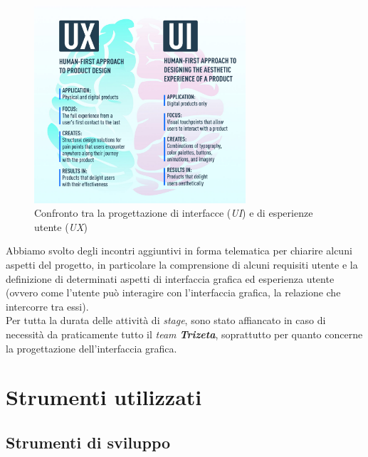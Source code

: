 \begin{figure}[H]
    \centering
    \includegraphics[width=0.7\textwidth]{images/difference-between-ux-and-ui.jpg}
    \caption[Confronto tra la progettazione di interfacce e di esperienze utente]{Confronto tra la progettazione di interfacce (\textit{UI}) e di esperienze utente (\textit{UX})\footnotemark}
\end{figure}
Abbiamo svolto degli incontri aggiuntivi in forma telematica per chiarire alcuni aspetti del progetto, in particolare la comprensione di alcuni requisiti utente e la definizione di determinati aspetti 
di interfaccia grafica ed esperienza utente (ovvero come l'utente può interagire con l'interfaccia grafica, la relazione che intercorre tra essi). \\
Per tutta la durata delle attività di \textit{stage}, sono stato affiancato in caso di necessità da praticamente tutto il \textit{team \textbf{Trizeta}}, soprattutto per quanto concerne la progettazione dell'interfaccia grafica.

\section{Strumenti utilizzati}

\subsection{Strumenti di sviluppo}
